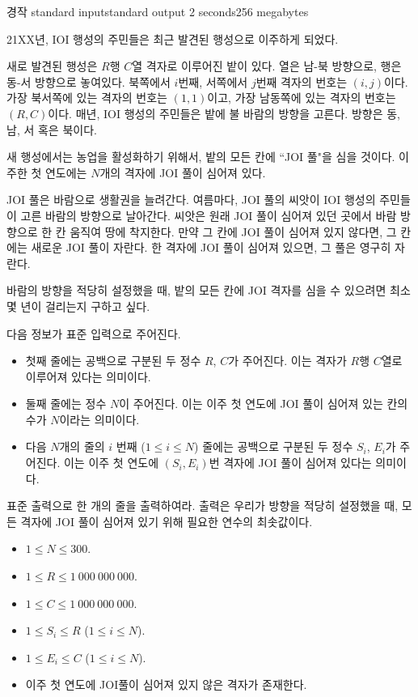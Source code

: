 \begin{problem}{경작}
	{standard input}{standard output}
	{2 seconds}{256 megabytes}{}
	
	21XX년, IOI 행성의 주민들은 최근 발견된 행성으로 이주하게 되었다.
	
	새로 발견된 행성은 $R$행 $C$열 격자로 이루어진 밭이 있다. 열은 남-북 방향으로, 행은 동-서 방향으로 놓여있다. 북쪽에서 $i$번째, 서쪽에서 $j$번째 격자의 번호는 $(i, j)$이다. 가장 북서쪽에 있는 격자의 번호는 $(1, 1)$이고, 가장 남동쪽에 있는 격자의 번호는 $(R, C)$이다. 매년, IOI 행성의 주민들은 밭에 불 바람의 방향을 고른다. 방향은 동, 남, 서 혹은 북이다.
	
	새 행성에서는 농업을 활성화하기 위해서, 밭의 모든 칸에 ``JOI 풀"을 심을 것이다. 이주한 첫 연도에는 $N$개의 격자에 JOI 풀이 심어져 있다.
	
	JOI 풀은 바람으로 생활권을 늘려간다. 여름마다, JOI 풀의 씨앗이 IOI 행성의 주민들이 고른 바람의 방향으로 날아간다. 씨앗은 원래 JOI 풀이 심어져 있던 곳에서 바람 방향으로 한 칸 움직여 땅에 착지한다. 만약 그 칸에 JOI 풀이 심어져 있지 않다면, 그 칸에는 새로운 JOI 풀이 자란다. 한 격자에 JOI 풀이 심어져 있으면, 그 풀은 영구히 자란다.
	
	바람의 방향을 적당히 설정했을 때, 밭의 모든 칸에 JOI 격자를 심을 수 있으려면 최소 몇 년이 걸리는지 구하고 싶다.
	

	\InputFile
	
	다음 정보가 표준 입력으로 주어진다.
	
	\begin{itemize}
		\item 첫째 줄에는 공백으로 구분된 두 정수 $R$, $C$가 주어진다. 이는 격자가 $R$행 $C$열로 이루어져 있다는 의미이다.
		\item 둘째 줄에는 정수 $N$이 주어진다. 이는 이주 첫 연도에 JOI 풀이 심어져 있는 칸의 수가 $N$이라는 의미이다.
		\item 다음 $N$개의 줄의 $i$ 번째 ($1 \le i \le N$) 줄에는 공백으로 구분된 두 정수 $S_i$, $E_i$가 주어진다. 이는 이주 첫 연도에 $(S_i, E_i)$번 격자에 JOI 풀이 심어져 있다는 의미이다.
	\end{itemize}

	
	\OutputFile
	
	표준 출력으로 한 개의 줄을 출력하여라. 출력은 우리가 방향을 적당히 설정했을 때, 모든 격자에 JOI 풀이 심어져 있기 위해 필요한 연수의 최솟값이다.
	
	\Constraints
	
	\begin{itemize}
	
	\item $1 \le N \le 300$.
	\item $1 \le R \le 1\ 000\ 000\ 000$.
	\item $1 \le C \le 1\ 000\ 000\ 000$.
	\item $1 \le S_i \le R$ ($1 \le i \le N$).
	\item $1 \le E_i \le C$ ($1 \le i \le N$).
	\item 이주 첫 연도에 JOI풀이 심어져 있지 않은 격자가 존재한다.		
	\end{itemize}
	

\end{problem}
